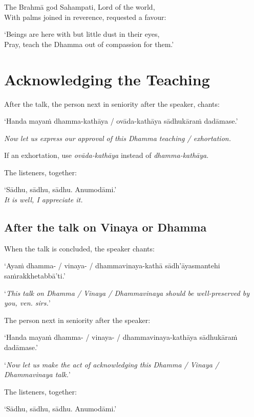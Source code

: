 \begin{english}
The Brahmā god Sahampati, Lord of the world,\\
With palms joined in reverence, requested a favour:

`Beings are here with but little dust in their eyes,\\
Pray, teach the Dhamma out of compassion for them.'
\end{english}


\section{Acknowledging the Teaching}

After the talk, the person next in seniority after the speaker, chants:

‘Handa mayaṁ dhamma-kathāya / ovāda-kathāya sādhukāraṁ dadāmase.’

\emph{Now let us express our approval of this Dhamma teaching / exhortation.}

If an exhortation, use \emph{ovāda-kathāya} instead of \emph{dhamma-kathāya}.

The listeners, together:

‘Sādhu, sādhu, sādhu. Anumodāmi.’\\
\emph{It is well, I appreciate it.}

\subsection{After the talk on Vinaya or Dhamma}

When the talk is concluded, the speaker chants:

‘Ayaṁ dhamma- / vinaya- / dhammavinaya-kathā sādh'āyasmantehi saṁrakkhetabbā'ti.’

‘\emph{This talk on Dhamma / Vinaya / Dhammavinaya should be well-preserved by you, ven. sirs.}’

The person next in seniority after the speaker:

‘Handa mayaṁ dhamma- / vinaya- / dhammavinaya-kathāya sādhukāraṁ dadāmase.’

‘\emph{Now let us make the act of acknowledging this Dhamma / Vinaya / Dhammavinaya talk.}’

The listeners, together:

‘Sādhu, sādhu, sādhu. Anumodāmi.’

\ifhandbookedition
\clearpage
\fi

